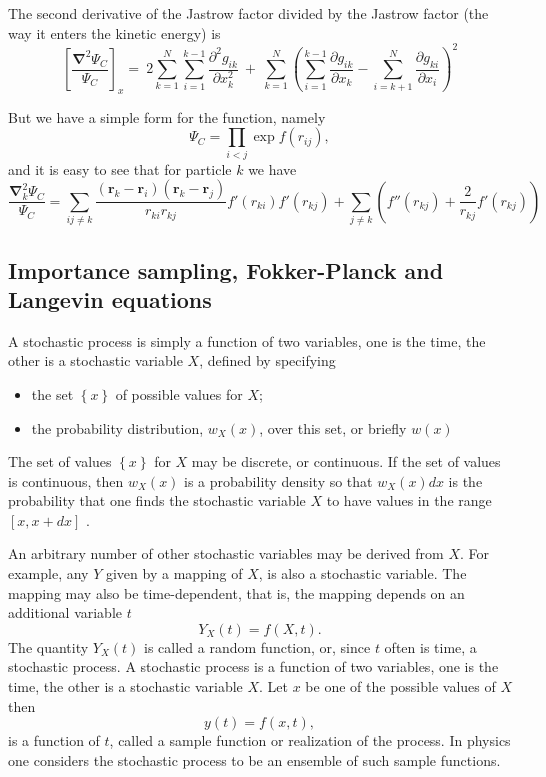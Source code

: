 The second derivative of the Jastrow factor divided by the Jastrow factor (the way it enters the kinetic energy) is
\[
\left[\frac{\mathbf{\nabla}^2 \Psi_C}{\Psi_C}\right]_x =\  
2\sum_{k=1}^{N}
\sum_{i=1}^{k-1}\frac{\partial^2 g_{ik}}{\partial x_k^2}\ +\ 
\sum_{k=1}^N
\left(
\sum_{i=1}^{k-1}\frac{\partial g_{ik}}{\partial x_k} -
\sum_{i=k+1}^{N}\frac{\partial g_{ki}}{\partial x_i}
\right)^2
\]

But we have a simple form for the function, namely
\[
\Psi_{C}=\prod_{i< j}\exp{f(r_{ij})},
\]
and it is easy to see that for particle  $k$
we have
\[
  \frac{\mathbf{\nabla}^2_k \Psi_C}{\Psi_C }=
\sum_{ij\ne k}\frac{(\mathbf{r}_k-\mathbf{r}_i)(\mathbf{r}_k-\mathbf{r}_j)}{r_{ki}r_{kj}}f'(r_{ki})f'(r_{kj})+
\sum_{j\ne k}\left( f''(r_{kj})+\frac{2}{r_{kj}}f'(r_{kj})\right)
\]

\subsection*{Importance sampling, Fokker-Planck and Langevin equations}

A stochastic process is simply a function of two variables, one is the time,
the other is a stochastic variable $X$, defined by specifying
\begin{itemize}
\item the set $\left\{x\right\}$ of possible values for $X$;

\item the probability distribution, $w_X(x)$,  over this set, or briefly $w(x)$
\end{itemize}

\noindent
The set of values $\left\{x\right\}$ for $X$ 
may be discrete, or continuous. If the set of
values is continuous, then $w_X (x)$ is a probability density so that 
$w_X (x)dx$
is the probability that one finds the stochastic variable $X$ to have values
in the range $[x, x + dx]$ .

     An arbitrary number of other stochastic variables may be derived from
$X$. For example, any $Y$ given by a mapping of $X$, is also a stochastic
variable. The mapping may also be time-dependent, that is, the mapping
depends on an additional variable $t$
\[
                              Y_X (t) = f (X, t) .
\]
The quantity $Y_X (t)$ is called a random function, or, since $t$ often is time,
a stochastic process. A stochastic process is a function of two variables,
one is the time, the other is a stochastic variable $X$. Let $x$ be one of the
possible values of $X$ then
\[
                               y(t) = f (x, t),
\]
is a function of $t$, called a sample function or realization of the process.
In physics one considers the stochastic process to be an ensemble of such
sample functions.

